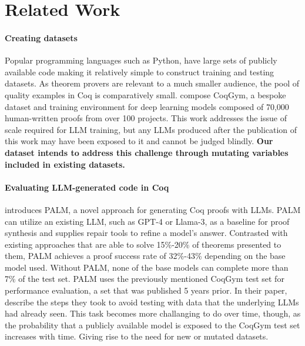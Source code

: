 
\section{Related Work}
\label{sec:related-work}


\paragraph{Creating datasets}
Popular programming
languages such as Python, have large sets of publicly available code making it relatively simple to construct training and testing datasets.
As theorem provers are relevant to a much smaller audience, the pool of quality examples in Coq is
comparatively small.
\citet{learningtoprove} compose CoqGym,
a bespoke dataset and training environment for deep learning models
composed of 70,000 human-written proofs from over 100 projects.
This work addresses the issue of scale required for LLM training,
but any LLMs produced
after the publication of this work
may have been exposed to it and cannot be judged blindly.
\textbf{Our dataset intends to address this challenge through mutating variables included in existing datasets.}

\paragraph{Evaluating LLM-generated code in Coq}
\citet{proofautomationwithllms} introduces PALM,
a novel approach for generating Coq proofs with LLMs.
PALM can utilize an existing LLM, such as GPT-4 or Llama-3,
as a baseline for proof synthesis and supplies repair tools
to refine a model's answer.
Contrasted with existing approaches that are able
to solve 15\%-20\% of theorems presented to them,
PALM achieves a proof success rate of 32\%-43\% 
depending on the base model used.
Without PALM, none of the base models can
complete more than 7\% of the test set.
PALM uses the previously mentioned CoqGym test set
for performance evaluation, 
a set that was published 5 years prior. 
In their paper, \citeauthor{proofautomationwithllms} describe the steps 
they took to avoid testing with data that the underlying LLMs had already seen.
This task becomes more challanging to do over time, though, as the probability that 
a publicly available model is exposed to the CoqGym test set increases with time. 
Giving rise to the need for new or mutated datasets. 


